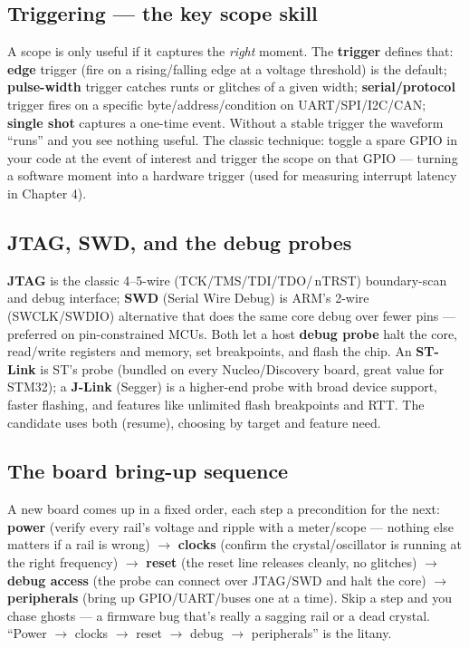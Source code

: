 \subsection{Triggering --- the key scope skill}

A scope is only useful if it captures the \emph{right} moment. The
\textbf{trigger} defines that: \textbf{edge} trigger (fire on a rising/falling
edge at a voltage threshold) is the default; \textbf{pulse-width} trigger
catches runts or glitches of a given width; \textbf{serial/protocol} trigger
fires on a specific byte/address/condition on UART/SPI/I2C/CAN; \textbf{single
shot} captures a one-time event. Without a stable trigger the waveform ``runs''
and you see nothing useful. The classic technique: toggle a spare GPIO in your
code at the event of interest and trigger the scope on that GPIO --- turning a
software moment into a hardware trigger (used for measuring interrupt latency in
Chapter 4).

\subsection{JTAG, SWD, and the debug probes}

\textbf{JTAG} is the classic 4--5-wire (TCK/TMS/TDI/TDO/\,nTRST) boundary-scan
and debug interface; \textbf{SWD} (Serial Wire Debug) is ARM's 2-wire
(SWCLK/SWDIO) alternative that does the same core debug over fewer pins ---
preferred on pin-constrained MCUs. Both let a host \textbf{debug probe} halt the
core, read/write registers and memory, set breakpoints, and flash the chip. An
\textbf{ST-Link} is ST's probe (bundled on every Nucleo/Discovery board, great
value for STM32); a \textbf{J-Link} (Segger) is a higher-end probe with broad
device support, faster flashing, and features like unlimited flash breakpoints
and RTT. The candidate uses both (resume), choosing by target and feature need.

\subsection{The board bring-up sequence}

A new board comes up in a fixed order, each step a precondition for the next:
\textbf{power} (verify every rail's voltage and ripple with a meter/scope ---
nothing else matters if a rail is wrong) $\rightarrow$ \textbf{clocks} (confirm
the crystal/oscillator is running at the right frequency) $\rightarrow$
\textbf{reset} (the reset line releases cleanly, no glitches) $\rightarrow$
\textbf{debug access} (the probe can connect over JTAG/SWD and halt the core)
$\rightarrow$ \textbf{peripherals} (bring up GPIO/UART/buses one at a time). Skip
a step and you chase ghosts --- a firmware bug that's really a sagging rail or a
dead crystal. ``Power $\rightarrow$ clocks $\rightarrow$ reset $\rightarrow$ debug
$\rightarrow$ peripherals'' is the litany.

